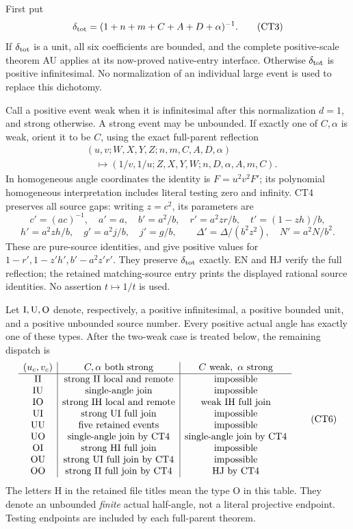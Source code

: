 First put
\[
 \delta_{\rm tot}=(1+n+m+C+A+D+\alpha)^{-1}.
\tag{CT3}
\]
If \(\delta_{\rm tot}\) is a unit, all six coefficients are bounded,
and the complete positive-scale theorem AU applies at its now-proved
native-entry interface.  Otherwise \(\delta_{\rm tot}\) is positive
infinitesimal.  No normalization of an individual large event is
used to replace this dichotomy.

Call a positive event weak when it is infinitesimal after this
normalization \(d=1\), and strong otherwise.  A strong event may be
unbounded.  If exactly one of \(C,\alpha\) is weak, orient it to be
\(C\), using the exact full-parent reflection
\[
\begin{split}
 &(u,v;W,X,Y,Z;n,m,C,A,D,\alpha)\\
 &\quad\longmapsto
 (1/v,1/u;Z,X,Y,W;n,D,\alpha,A,m,C).
\end{split}\tag{CT4}
\]
In homogeneous angle coordinates the identity is
\(F=u^2v^2F'\); its polynomial homogeneous interpretation includes
literal testing zero and infinity.  CT4 preserves all source gaps:
writing \(z=c^2\), its parameters are
\[
 c'=(ac)^{-1},\quad a'=a,\quad b'=a^2/b,\quad
 r'=a^2zr/b,\quad t'=(1-zh)/b,
\]
\[
 h'=a^2zh/b,\quad g'=a^2j/b,\quad j'=g/b,\qquad
 \Delta'=\Delta/(b^2z^2),\quad N'=a^2N/b^2 .
\tag{CT5}
\]
These are pure-source identities, and give positive values for
\(1-r',1-z'h',b'-a^2z'r'\).  They preserve
\(\delta_{\rm tot}\) exactly.  EN and HJ verify the full reflection;
the retained matching-source entry prints the displayed rational
source identities.  No assertion \(t\mapsto1/t\) is used.

Let \({\rm I},{\rm U},{\rm O}\) denote, respectively, a positive
infinitesimal, a positive bounded unit, and a positive unbounded
source number.  Every positive actual angle has exactly one of
these types.  After the two-weak case is treated below, the
remaining dispatch is
\[
\begin{array}{c|c|c}
(u_c,v_c)&C,\alpha\text{ both strong}
                 &C\text{ weak},\ \alpha\text{ strong}\\ \hline
{\rm II}&\text{strong II local and remote}&\text{impossible}\\
{\rm IU}&\text{single-angle join}&\text{impossible}\\
{\rm IO}&\text{strong IH local and remote}&\text{weak IH full join}\\
{\rm UI}&\text{strong UI full join}&\text{impossible}\\
{\rm UU}&\text{five retained events}&\text{impossible}\\
{\rm UO}&\text{single-angle join by CT4}&\text{single-angle join by CT4}\\
{\rm OI}&\text{strong HI full join}&\text{impossible}\\
{\rm OU}&\text{strong UI full join by CT4}&\text{impossible}\\
{\rm OO}&\text{strong II full join by CT4}&\text{HJ by CT4}
\end{array}\tag{CT6}
\]
The letters H in the retained file titles mean the type O in this
table.  They denote an unbounded \emph{finite} actual half-angle,
not a literal projective endpoint.  Testing endpoints are included
by each full-parent theorem.

